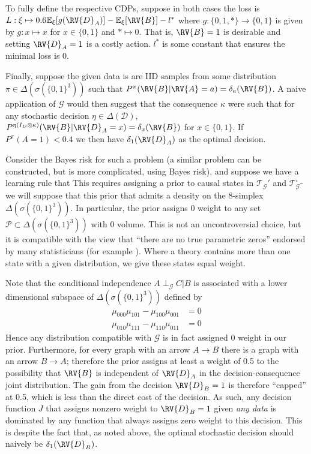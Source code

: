 To fully define the respective CDPs, suppose in both cases the loss is $L:\xi\mapsto 0.6\mathbb{E}_\xi[g(\RV{D}_A)] - \mathbb{E}_{\xi}[\RV{B}] - l^*$ where $g:\{0,1,*\}\to \{0,1\}$ is given by $g:x\mapsto x$ for $x\in \{0,1\}$ and $*\mapsto 0$. That is, $\RV{B}=1$ is desirable and setting $\RV{D}_A=1$ is a costly action. $l^*$ is some constant that ensures the minimal loss is 0.

Finally, suppose the given data is are IID samples from some distribution $\pi\in \Delta(\sigma(\{0,1\}^3))$ such that $P^\pi(\RV{B}|\RV{A}=a)=\delta_a(\RV{B})$. A naive application of $\mathcal{G}$ would then suggest that the consequence $\kappa$ were such that for any stochastic decision $\eta\in \Delta(\mathcal{D})$, $P^{\eta {(I_D\otimes \kappa)}}(\RV{B}|\RV{D}_A = x) =\delta_x(\RV{B})$ for $x\in\{0,1\}$. If $P^\pi(A=1)<0.4$ we then have $\delta_1(\RV{D}_A)$ as the optimal decision.

Consider the Bayes risk for such a problem (a similar problem can be constructed, but is more complicated, using Bayes risk), and suppose we have a learning rule that  This requires assigning a prior to causal states in $\mathscr{T}_{\mathcal{G}}'$ and $\mathscr{T}_{\mathcal{G}}^\square$- we will suppose that this prior that admits a density on the 8-simplex $\Delta(\sigma(\{0,1\}^3))$. In particular, the prior assigns 0 weight to any set $\mathscr{P}\subset\Delta(\sigma(\{0,1\}^3))$ with 0 volume. This is not an uncontroversial choice, but it is compatible with the view that ``there are no true parametric zeros'' endorsed by many statisticians (for example  \cite{gelman_bayesian_2010,meehl_theory-testing_1967,berkson_difficulties_1938}). Where a theory contains more than one state with a given distribution, we give these states equal weight. 

Note that the conditional independence $A\perp_\mathcal{G} C | B$ is associated with a lower dimensional subspace of $\Delta(\sigma(\{0,1\}^3))$ defined by 
\begin{align}
    \mu_{000}\mu_{101}-\mu_{100}\mu_{001}&=0\label{eq:ci0}\\
    \mu_{010}\mu_{111}-\mu_{110}\mu_{011}&=0 \label{eq:ci}
\end{align}
Hence any distribution compatible with $\mathcal{G}$ is in fact assigned 0 weight in our prior. Furthermore, for every graph with an arrow $A\to B$ there is a graph with an arrow $B\to A$; therefore the prior assigns at least a weight of 0.5 to the possibility that $\RV{B}$ is independent of $\RV{D}_A$ in the decision-consequence joint distribution. The gain from the decision $\RV{D}_B=1$ is therefore ``capped'' at 0.5, which is less than the direct cost of the decision. As such, any decision function $J$ that assigns nonzero weight to $\RV{D}_B = 1$ given \emph{any data} is dominated by any function that always assigns zero weight to this decision. This is despite the fact that, as noted above, the optimal stochastic decision should naively be $\delta_1(\RV{D}_B)$.

